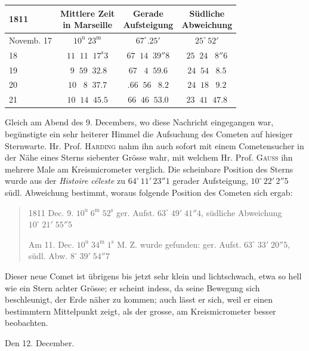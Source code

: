 \begin{center}
\fontsize{10}{12}\selectfont\setlength{\tabcolsep}{3pt}\renewcommand{\arraystretch}{1.15}\begin{tabular}{l|c|c|c}
1811 & \shortstack{Mittlere Zeit\\in Marseille} & \shortstack{Gerade\\Aufsteigung} & \shortstack{Südliche\\Abweichung} \\ \hline
Novemb. 17 & $10^{\mathrm u}\;23^{\mathrm m}$ & $67^\circ.25'$ & $25^\circ\,52'$ \\
18 & $11\;\;11\;\;17^{\mathrm s}3$ & $67\;\;14\;\;39''8$ & $25\;\;24\;\;\;8''6$ \\
19 & $\;9\;\;59\;\;32.8$ & $67\;\;\;4\;\;59.6$ & $24\;\;54\;\;\;8.5$ \\
20 & $10\;\;\;8\;\;37.7$ & $.66\;\;56\;\;\;8.2$ & $24\;\;18\;\;\;9.2$ \\
21 & $10\;\;14\;\;45.5$ & $66\;\;46\;\;53.0$ & $23\;\;41\;\;47.8$ \\
\end{tabular}
\end{center}


\par\indent Gleich am Abend des 9. Decembers, wo diese Nachricht eingegangen war, begünstigte ein sehr heiterer Himmel die Aufsuchung des Cometen auf hiesiger Sternwarte. Hr. Prof. \textsc{Harding} nahm ihn auch sofort mit einem Cometensucher in der Nähe eines Sterns siebenter Grösse wahr, mit welchem Hr. Prof. \textsc{Gauss} ihn mehrere Male am Kreismicrometer verglich. Die scheinbare Position des Sterns wurde aus der \emph{Histoire céleste} zu $64^\circ\,11'\,23''1$ gerader Aufsteigung, $10^\circ\,22'\,2''5$ südl. Abweichung bestimmt, woraus folgende Position des Cometen sich ergab:

\begin{quote}\raggedright 1811 Dec. 9. $10^{\mathrm u}\;6^{\mathrm m}\;52^{\mathrm s}$ ger. Aufst. $63^\circ\;49'\;41''4$, südliche Abweichung $10^\circ\;21'\;55''5$\par\medskip Am 11. Dec. $10^{\mathrm u}\;34^{\mathrm m}\;1^{\mathrm s}$ M. Z. wurde gefunden: ger. Aufst. $63^\circ\;33'\;20''5$, südl. Abw. $8^\circ\;39'\;54''7$\end{quote}


\par\indent Dieser neue Comet ist übrigens bis jetzt sehr klein und lichtschwach, etwa so hell wie ein Stern achter Grösse; er scheint indess, da seine Bewegung sich beschleunigt, der Erde näher zu kommen; auch lässt er sich, weil er einen bestimmtern Mittelpunkt zeigt, als der grosse, am Kreismicrometer besser beobachten.


\par\indent Den 12. December.


